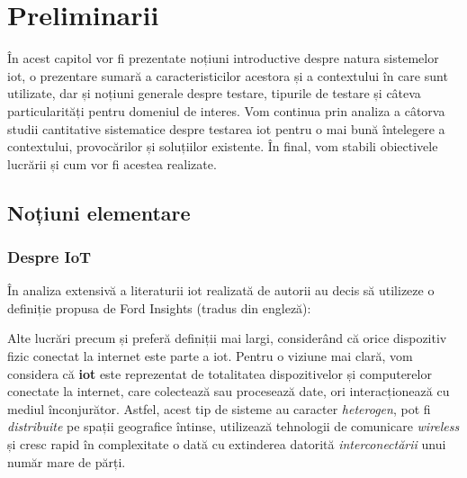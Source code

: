 \chapter{Preliminarii}

În acest capitol vor fi prezentate noțiuni introductive despre natura sistemelor \acrfull{iot}, o prezentare sumară a caracteristicilor acestora și a contextului în care sunt utilizate, dar și noțiuni generale despre testare, tipurile de testare și câteva particularități pentru domeniul de interes. Vom continua prin analiza a câtorva studii cantitative sistematice despre testarea \acrshort{iot} pentru o mai bună întelegere a contextului, provocărilor și soluțiilor existente. În final, vom stabili obiectivele lucrării și cum vor fi acestea realizate.

\section{Noțiuni elementare}

\subsection{Despre IoT}


În analiza extensivă a literaturii \acrshort{iot} realizată de \cite{Nord2019} autorii au decis să utilizeze o definiție propusa de Ford Insights \cite{insight2017internet} (tradus din engleză):



Alte lucrări precum \cite{Lee2015} și \cite{Huang2015} preferă definiții mai largi, considerând că orice dispozitiv fizic conectat la internet este parte a \acrshort{iot}. Pentru o viziune mai clară, vom considera că \textbf{\acrshort{iot}} este reprezentat de totalitatea dispozitivelor și computerelor conectate la internet, care colectează sau procesează date, ori interacționează cu mediul înconjurător. Astfel, acest tip de sisteme au caracter \emph{heterogen}, pot fi \emph{distribuite} pe spații geografice întinse, utilizează tehnologii de comunicare \emph{wireless} și cresc rapid în complexitate o dată cu extinderea datorită \emph{interconectării} unui număr mare de părți.

